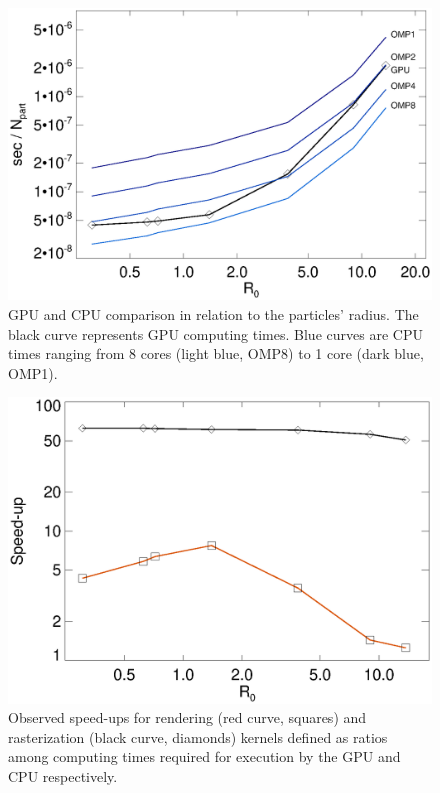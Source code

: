 \documentclass[preprint,5pt]{elsarticle}
\begin{document}
\begin{figure}
\centering
\includegraphics[scale=0.5]{scalaompK20-fig7.eps}
\caption{GPU and CPU comparison in relation to the particles' radius. The black curve represents GPU computing times. Blue curves are CPU times ranging from 8 cores (light blue, OMP8) to 1 core (dark blue, OMP1).}
\label{fig:gpucpu}
\end{figure}

\begin{figure}
\centering
\includegraphics[scale=0.5]{speedupK20-fig8.eps}
\caption{
Observed speed-ups for rendering (red curve, squares) and rasterization (black curve, diamonds) kernels defined as ratios among computing times required for execution by the GPU and CPU respectively.
}
\label{fig:speedup}
\end{figure}
\end{document}
